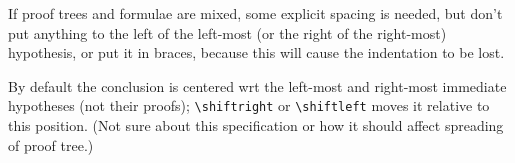 If proof trees and formulae are mixed, some explicit spacing is needed,
but don't put anything to the left of the left-most (or the right of
the right-most) hypothesis, or put it in braces, because this will cause
the indentation to be lost.

By default the conclusion is centered wrt the left-most and right-most
immediate hypotheses (not their proofs); \verb/\shiftright/ or
\verb/\shiftleft/ moves it relative to this position.
(Not sure about this specification or how
it should affect spreading of proof tree.)

